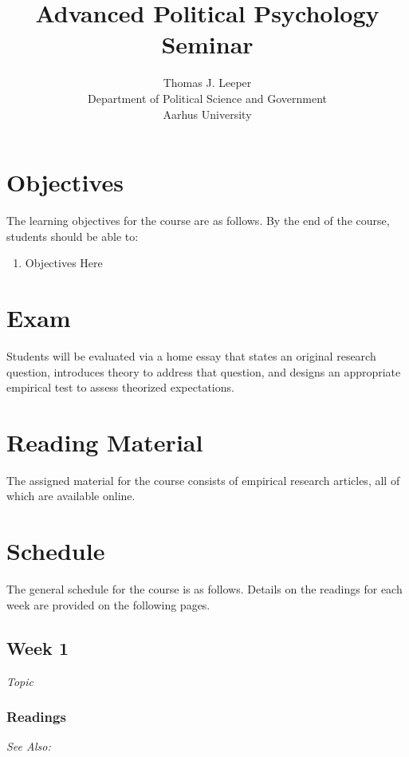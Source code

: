 \documentclass[12pt,a4paper]{article}
\title{Advanced Political Psychology Seminar}
\author{Thomas J. Leeper\\
Department of Political Science and Government\\
Aarhus University}
\newcommand{\seealso}{\noindent \emph{See Also:}\\}
\begin{document}
\nobibliography*

\maketitle

\faketableofcontents


\section{Objectives}
The learning objectives for the course are as follows. By the end of the course, students should be able to:

\begin{enumerate}
\item Objectives Here
\end{enumerate}

\section{Exam}
Students will be evaluated via a home essay that states an original research question, introduces theory to address that question, and designs an appropriate empirical test to assess theorized expectations.

\section{Reading Material}
The assigned material for the course consists of empirical research articles, all of which are available online.

\clearpage
\section{Schedule}
The general schedule for the course is as follows. Details on the readings for each week are provided on the following pages.

\secttoc

\clearpage


\clearpage
\subsection{Week 1}
\emph{Topic}
\vspace{1em}

\subsubsection*{Readings}

\seealso




\end{document}
